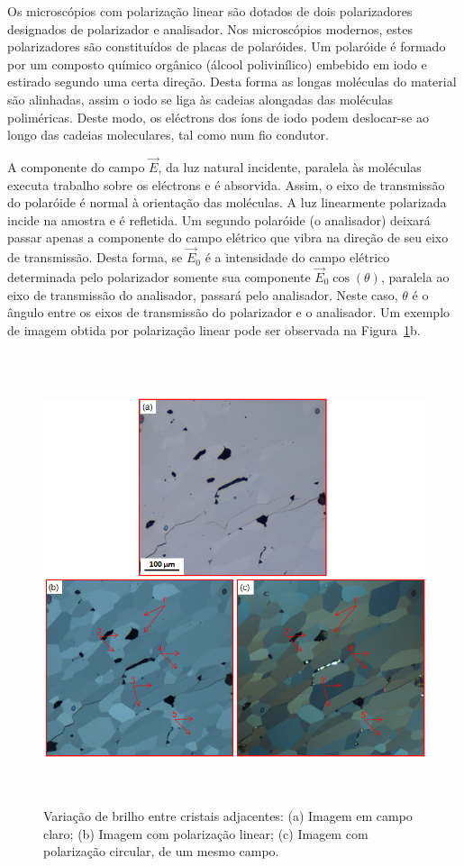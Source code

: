 Os microscópios com polarização linear são dotados de dois
polarizadores designados de polarizador e analisador. Nos microscópios
modernos, estes polarizadores são constituídos de placas de
polaróides. Um polaróide é formado por um composto químico orgânico
(álcool polivinílico) embebido em iodo e estirado segundo uma certa
direção. Desta forma as longas moléculas do material são alinhadas,
assim o iodo se liga às cadeias alongadas das moléculas
poliméricas. Deste modo, os eléctrons dos íons de iodo podem
deslocar-se ao longo das cadeias moleculares, tal como num fio
condutor.

A componente do campo $\vec{E}$, da luz natural incidente, paralela às
moléculas executa trabalho sobre os eléctrons e é absorvida. Assim, o
eixo de transmissão do polaróide é normal à orientação das
moléculas. A luz linearmente polarizada incide na amostra e é
refletida. Um segundo polaróide (o analisador) deixará passar apenas a
componente do campo elétrico que vibra na direção de seu eixo de
transmissão. Desta forma, se $\vec{E}_{0}$ é a intensidade do campo
elétrico determinada pelo polarizador somente sua componente
$\vec{E}_{0}\cos(\theta)$, paralela ao eixo de transmissão do
analisador, passará pelo analisador. Neste caso, $\theta$ é o ângulo
entre os eixos de transmissão do polarizador e o analisador. Um
exemplo de imagem obtida por polarização linear pode ser observada na
Figura~\ref{fig:bf-pol-cpol}b.

\begin{figure} [h]
  \begin{center}
    \includegraphics[height=376pt,width=400pt]{images/fig_bf-pol-cpol}
    \caption{Variação de brilho entre cristais adjacentes: (a) Imagem
      em campo claro; (b) Imagem com polarização linear; (c) Imagem
      com polarização circular, de um mesmo
      campo.}\label{fig:bf-pol-cpol}
  \end{center}
\end{figure}
 
